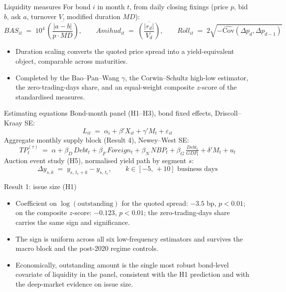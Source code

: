 \documentclass[aspectratio=169,11pt]{beamer}
\begin{document}
\begin{frame}{Liquidity measures}
  \small For bond $i$ in month $t$, from daily closing fixings (price $p$, bid
  $b$, ask $a$, turnover $V$, modified duration $MD$):
  \[ BAS_{it} \;=\; 10^{4}\,\overline{\left(\frac{|a-b|}{p\cdot MD}\right)},
     \qquad
     Amihud_{it} \;=\; \overline{\left(\frac{|r_d|}{V_d}\right)},
     \qquad
     Roll_{it} \;=\; 2\sqrt{-\widehat{\mathrm{Cov}}(\Delta p_d,\Delta p_{d-1})} \]
  \begin{itemize}
    \item Duration scaling converts the quoted price spread into a
          yield-equivalent object, comparable across maturities.
    \item Completed by the Bao--Pan--Wang $\gamma$, the Corwin--Schultz
          high-low estimator, the zero-trading-days share, and an equal-weight
          composite $z$-score of the standardised measures.
  \end{itemize}
\end{frame}

\begin{frame}{Estimating equations}
  \small Bond-month panel (H1--H3), bond fixed effects, Driscoll--Kraay SE:
  \[ L_{it} \;=\; \alpha_i + \beta' X_{it} + \gamma' M_t + \varepsilon_{it} \]
  Aggregate monthly supply block (Result 4), Newey--West SE:
  \[ TP_t^{(\tau)} \;=\; \alpha + \beta_D\, Debt_t + \beta_F\, Foreign_t
     + \beta_N\, NBP_t + \beta_G\, \tfrac{Debt_t}{GDP_t}
     + \delta' M_t + u_t \]
  Auction event study (H5), normalised yield path by segment $s$:
  \[ \Delta y_{s,k} \;=\; y_{s,\,t_e+k} - y_{s,\,t_e},
     \qquad k \in [-5,\,+10] \text{ business days} \]
\end{frame}

\begin{frame}{Result 1: issue size (H1)}
  \begin{itemize}
    \item Coefficient on $\log(\text{outstanding})$ for the quoted spread:
          $-3.5$ bp, $p<0.01$; on the composite $z$-score: $-0.123$,
          $p<0.01$; the zero-trading-days share carries the same sign and
          significance.
    \item The sign is uniform across all six low-frequency estimators and
          survives the macro block and the post-2020 regime controls.
    \item Economically, outstanding amount is the single most robust
          bond-level covariate of liquidity in the panel, consistent with the
          H1 prediction and with the deep-market evidence on issue size.
  \end{itemize}
\end{frame}
\end{document}
